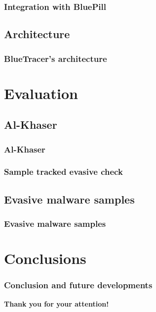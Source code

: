 \documentclass[compress]{beamer}
\begin{document}
\begin{frame}
    \frametitle{Integration with BluePill}
	

\end{frame}

\subsection{Architecture}

\begin{frame}
    \frametitle{BlueTracer's architecture}
	

\end{frame}

\section{Evaluation}

\subsection{Al-Khaser}
\begin{frame}
    \frametitle{Al-Khaser}
	

\end{frame}

\begin{frame}
    \frametitle{Sample tracked evasive check}
	

\end{frame}

\subsection{Evasive malware samples}
\begin{frame}
    \frametitle{Evasive malware samples}
	

\end{frame}

\section{Conclusions}

\begin{frame}
    \frametitle{Conclusion and future developments}
	

\end{frame}

\begin{frame}
\begin{center}
{\fontsize{15}{15}\selectfont \textbf{Thank you for your attention!}}
\end{center}
\end{frame}
\end{document}
